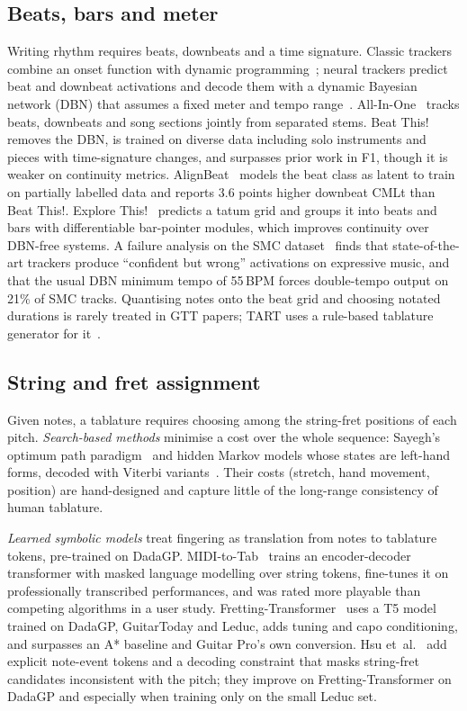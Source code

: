 \subsection{Beats, bars and meter}
\label{sec:rhythm}
Writing rhythm requires beats, downbeats and a time signature. Classic
trackers combine an onset function with dynamic programming~\cite{ellis2007beat};
neural trackers predict beat and downbeat activations and decode them with a
dynamic Bayesian network (DBN) that assumes a fixed meter and tempo
range~\cite{bock2016joint}. All-In-One~\cite{kim2023allinone} tracks beats,
downbeats and song sections jointly from separated stems.
Beat This!~\cite{foscarin2024beatthis} removes the DBN, is trained on diverse
data including solo instruments and pieces with time-signature changes, and
surpasses prior work in F1, though it is weaker on continuity metrics.
AlignBeat~\cite{ahn2025alignbeat} models the beat class as latent to train on
partially labelled data and reports 3.6 points higher downbeat CMLt than Beat
This!. Explore This!~\cite{kihlborg2026explore} predicts a tatum grid and
groups it into beats and bars with differentiable bar-pointer modules, which
improves continuity over DBN-free systems. A failure analysis on the SMC
dataset~\cite{ahn2026smc} finds that state-of-the-art trackers produce
``confident but wrong'' activations on expressive music, and that the usual
DBN minimum tempo of 55\,BPM forces double-tempo output on 21\% of SMC tracks.
Quantising notes onto the beat grid and choosing notated durations is rarely
treated in GTT papers; TART uses a rule-based tablature generator for
it~\cite{gupta2026tart}.

\subsection{String and fret assignment}
\label{sec:fingering}
Given notes, a tablature requires choosing among the string-fret positions of
each pitch. \emph{Search-based methods} minimise a cost over the whole
sequence: Sayegh's optimum path paradigm~\cite{sayegh1989fingering} and
hidden Markov models whose states are left-hand forms, decoded with Viterbi
variants~\cite{hori2016minimax}. Their costs (stretch, hand movement,
position) are hand-designed and capture little of the long-range consistency
of human tablature.

\emph{Learned symbolic models} treat fingering as translation from notes to
tablature tokens, pre-trained on DadaGP. MIDI-to-Tab~\cite{edwards2024miditotab}
trains an encoder-decoder transformer with masked language modelling over
string tokens, fine-tunes it on professionally transcribed performances, and
was rated more playable than competing algorithms in a user study.
Fretting-Transformer~\cite{hamberger2025fretting} uses a T5 model trained on
DadaGP, GuitarToday and Leduc, adds tuning and capo conditioning, and
surpasses an A* baseline and Guitar Pro's own conversion. Hsu
et~al.~\cite{hsu2026noteevent} add explicit note-event tokens and a decoding
constraint that masks string-fret candidates inconsistent with the pitch; they
improve on Fretting-Transformer on DadaGP and especially when training only on
the small Leduc set.


